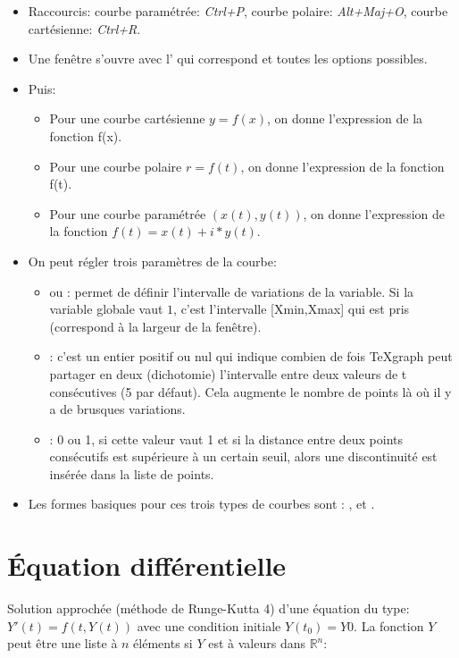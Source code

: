 \begin{itemize}
\item Raccourcis: courbe paramétrée: \textsl{Ctrl+P}, courbe polaire:  \textsl{Alt+Maj+O}, courbe cartésienne: 
\textsl{Ctrl+R}.
\item Une fenêtre s'ouvre avec l' qui correspond et toutes les options possibles.
\item Puis:
    \begin{itemize}
    \item Pour une courbe cartésienne $y=f(x)$, on donne l'expression de la fonction f(x).
    \item Pour une courbe polaire $r=f(t)$, on donne l'expression de la fonction f(t).
    \item Pour une courbe paramétrée $(x(t),y(t))$, on donne l'expression de la fonction $f(t)=x(t)+i*y(t)$.
\end{itemize}
\item On peut régler trois paramètres de la courbe: 
\begin{itemize}
    \item {} ou : permet de définir l'intervalle de variations de la variable. Si la variable globale  vaut $1$, c'est l'intervalle [Xmin,Xmax] qui est pris (correspond à la largeur de la fenêtre).
    \item {}: c'est un entier positif ou nul qui indique combien de fois TeXgraph peut partager en deux (dichotomie) l'intervalle entre deux valeurs de t consécutives (5 par défaut). Cela augmente le nombre de points là où il y a de brusques variations.
    \item {}: 0 ou 1, si cette valeur vaut 1 et si la distance entre deux points consécutifs est supérieure à un certain seuil, alors une discontinuité est insérée dans la liste de points.
    \end{itemize}
\item Les formes basiques pour ces trois types de courbes sont : ,  et .
\end{itemize}

\section{Équation différentielle}

Solution approchée (méthode de Runge-Kutta 4) d'une équation du type: $Y'(t)=f(t,Y(t))$ avec une condition
initiale $Y(t_0)=Y0$. La fonction $Y$ peut être une liste à $n$ éléments si $Y$ est à valeurs dans $\mathbb R^n$:

